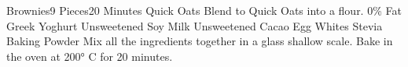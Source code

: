 \begin{recipe}{Brownies}{9 Pieces}{20 Minutes}
     {Quick Oats}
    Blend to Quick Oats into a flour.
     {0\% Fat Greek Yoghurt}
     {Unsweetened Soy Milk}
     {Unsweetened Cacao}
     {Egg Whites}
     {Stevia}
     {Baking Powder}
    Mix all the ingredients together in a glass shallow scale.
    Bake in the oven at 200° C for 20 minutes.
\end{recipe}